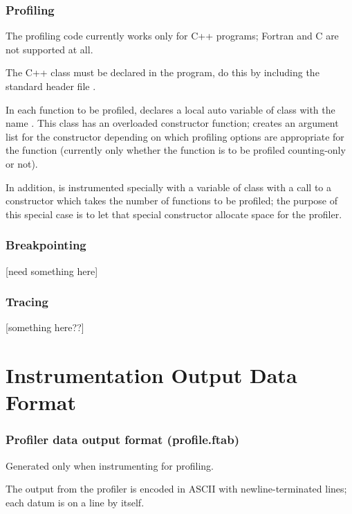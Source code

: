 \subsubsection{Profiling}

The profiling code currently works only for C++ programs; Fortran and C
are not supported at all.

The C++ class  must be declared in the program,
do this by including the standard header file
. 

In each function to be profiled,  declares a local auto
variable of class  with the name . This
class has an overloaded constructor function;  creates an
argument list for the constructor depending on which profiling options
are appropriate for the function (currently only whether the function is
to be profiled counting-only or not).

In addition,  is instrumented specially with a
variable of class  with a call to a constructor which
takes the number of functions to be profiled; the purpose of this
special case is to let that special constructor allocate space for the
profiler.

\subsubsection{Breakpointing}

[need something here]

\subsubsection{Tracing}

[something here??]

\section{Instrumentation Output Data Format}

\subsubsection{Profiler data output format (profile.ftab)}

Generated only when instrumenting for profiling.

The output from the profiler is encoded in ASCII with newline-terminated
lines; each datum is on a line by itself.

